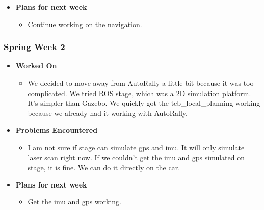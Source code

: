 \documentclass[compsoc,draftclsnofoot,onecolumn,10pt]{IEEEtran}
\begin{document}
\begin{itemize}
    \item{\textbf{Plans for next week}}
    \begin{itemize}
      \item Continue working on the navigation.
    \end{itemize}

\end{itemize}

\subsubsection{Spring Week 2}
\begin{itemize}
    \item {\textbf{Worked On}}
    \begin{itemize}
      \item We decided to move away from AutoRally a little bit because it was
      too complicated. We tried ROS stage, which was a 2D simulation platform.
      It's simpler than Gazebo. We quickly got the teb\_local\_planning working
      because we already had it working with AutoRally.
    \end{itemize}

    \item {\textbf{Problems Encountered}}
    \begin{itemize}
      \item I am not sure if stage can simulate gps and imu. It will only simulate
      laser scan right now. If we couldn't get the imu and gps simulated on
      stage, it is fine. We can do it directly on the car.
    \end{itemize}

    \item{\textbf{Plans for next week}}
    \begin{itemize}
      \item Get the imu and gps working.
    \end{itemize}

\end{itemize}
\end{document}
